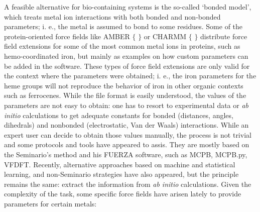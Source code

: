 A feasible alternative for bio-containing systems is the so-called ‘bonded model’, which treats metal ion interactions with both bonded and non-bonded parameters; i. e., the metal is assumed to bond to some residues. Some of the protein-oriented force fields like AMBER $ \{ $ $ \} $  or CHARMM $ \{ $ $ \} $  distribute force field extensions for some of the most common metal ions in proteins, such as hemo-coordinated iron, but mainly as examples on how custom parameters can be added in the software. These types of force field extensions are only valid for the context where the parameters were obtained; i. e., the iron parameters for the heme groups will not reproduce the behavior of iron in other organic contexts such as ferrocenes. While the file format is easily understood, the values of the parameters are not easy to obtain: one has to resort to experimental data or \textit{ab initio} calculations to get adequate constants for bonded (distances, angles, dihedrals) and nonbonded (electrostatic, Van der Waals) interactions. While an expert user can decide to obtain those values manually, the process is not trivial and some protocols and tools have appeared to assis. They are mostly based on the Seminario’s method and his FUERZA software, \cite{Seminario1996} such as MCPB, MCPB.py,\cite{li2016} VFDFT.\cite{zheng2016} Recently, alternative approaches based on machine and statistical learning, \cite{fracchia2017,li2017b} and non-Seminario strategies\cite{Burger2012, allen2017} have also appeared, but the principle remains the same: extract the information from \textit{ab initio} calculations. Given the complexity of the task, some specific force fields have arisen lately to provide parameters for certain metals:

